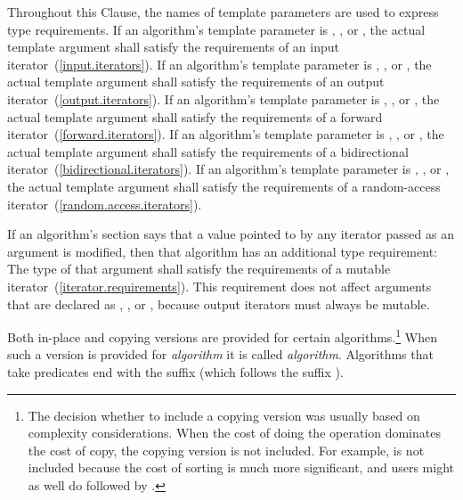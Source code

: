 
\begin{removedblock}
\pnum
Throughout this Clause, the names of template parameters
are used to express type requirements.
If an algorithm's template parameter is
,
,
or
,
the actual template argument shall satisfy the
requirements of an input iterator~(\ref{input.iterators}).
If an algorithm's template parameter is
,
,
or
,
the actual template argument shall satisfy the requirements
of an output iterator~(\ref{output.iterators}).
If an algorithm's template parameter is
,
,
or
,
the actual template argument shall satisfy the requirements
of a forward iterator~(\ref{forward.iterators}).
If an algorithm's template parameter is
,
,
or
,
the actual template argument shall satisfy the requirements
of a bidirectional iterator~(\ref{bidirectional.iterators}).
If an algorithm's template parameter is
,
,
or
,
the actual template argument shall satisfy the requirements
of a random-access iterator~(\ref{random.access.iterators}).

\pnum
If an algorithm's
section says that a value pointed to by any iterator passed
as an argument is modified, then that algorithm has an additional
type requirement:
The type of that argument shall satisfy the requirements
of a mutable iterator~(\ref{iterator.requirements}).
\enternote
This requirement does not affect arguments that are declared as
,
,
or
,
because output iterators must always be mutable.
\exitnote
\end{removedblock}

\pnum
Both in-place and copying versions are provided for certain
algorithms.\footnote{The decision whether to include a copying version was
usually based on complexity considerations. When the cost of doing the operation
dominates the cost of copy, the copying version is not included. For example,
 is not included because the cost of sorting is much more
significant, and users might as well do  followed by .}
When such a version is provided for \textit{algorithm} it is called
\textit{algorithm}. Algorithms that take predicates end with the
suffix  (which follows the suffix ).

